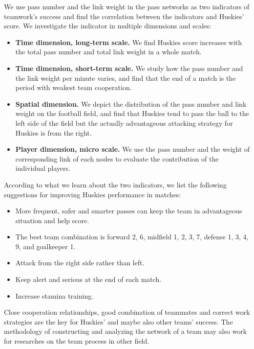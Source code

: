 \documentclass[12pt]{article}
\begin{document}
We use pass number and the link weight in the pass networks as two indicators of teamwork's success and find the correlation between the indicators and Huskies' score. We investigate the indicator in multiple dimensions and scales:
\begin{itemize}
	\item \textbf{Time dimension, long-term scale.} We find Huskies score increases with the total pass number and total link weight in a whole match.
	\item \textbf{Time dimension, short-term scale.} We study how the pass number and the link weight per minute varies, and find that the end of a match is the period with weakest team cooperation.
	\item \textbf{Spatial dimension.} We depict the distribution of the pass number and link weight on the football field, and find that Huskies tend to pass the ball to the left side of the field but the actually advantageous attacking strategy for Huskies is from the right.
	\item \textbf{Player dimension, micro scale.} We use the pass number and the weight of corresponding link of each nodes to evaluate the contribution of the individual players.
\end{itemize}

According to what we learn about the two indicators, we list the following suggestions for improving Huskies performance in matches:
\begin{itemize}
	\item More frequent, safer and smarter passes can keep the team in advantageous situation and help score.
	\item The best team combination is forward 2, 6, midfield 1, 2, 3, 7, defense 1, 3, 4, 9, and goalkeeper 1.
	\item Attack from the right side rather than left.
	\item Keep alert and serious at the end of each match.
	\item Increase stamina training.
\end{itemize}

Close cooperation relationships, good combination of teammates and correct work strategies are the key for Huskies' and maybe also other teams' success. The methodology of constructing and analyzing the network of a team may also work for researches on the team process in other field.

\clearpage
\pagestyle{fancy}
\tableofcontents
\newpage
\setcounter{page}{1}
\end{document}

